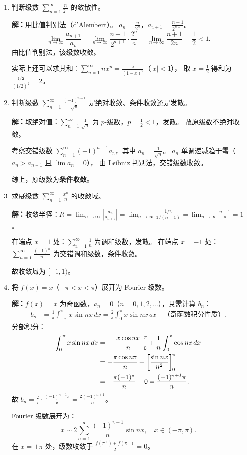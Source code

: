 \documentclass[12pt,a4paper]{ctexart}
\begin{document}
\begin{enumerate}[leftmargin=*,label=\arabic*.,start=46]
  \item 判断级数 $\displaystyle\sum_{n=1}^{\infty}\frac{n}{2^n}$ 的敛散性。

    \textbf{解：}用比值判别法（d'Alembert）。
    $a_n = \frac{n}{2^n}$，$a_{n+1} = \frac{n+1}{2^{n+1}}$。
    \[
    \lim_{n\to\infty}\frac{a_{n+1}}{a_n}
    = \lim_{n\to\infty}\frac{n+1}{2^{n+1}} \cdot \frac{2^n}{n}
    = \lim_{n\to\infty}\frac{n+1}{2n}
    = \frac{1}{2} < 1.
    \]
    由比值判别法，该级数收敛。

    实际上还可以求其和：$\sum_{n=1}^{\infty} n x^n = \frac{x}{(1-x)^2}$（$|x|<1$），
    取 $x=\frac{1}{2}$ 得和为 $\frac{1/2}{(1/2)^2} = 2$。

  \item 判断级数 $\displaystyle\sum_{n=1}^{\infty}\frac{(-1)^{n-1}}{\sqrt{n}}$ 是绝对收敛、条件收敛还是发散。

    \textbf{解：}取绝对值：$\sum_{n=1}^{\infty} \frac{1}{\sqrt{n}}$ 为 $p$-级数，$p=\frac{1}{2} < 1$，发散。
    故原级数不绝对收敛。

    考察交错级数 $\sum_{n=1}^{\infty} (-1)^{n-1} a_n$，其中 $a_n = \frac{1}{\sqrt{n}}$。
    $a_n$ 单调递减趋于零（$a_n > a_{n+1}$ 且 $\lim a_n = 0$），
    由 Leibniz 判别法，交错级数收敛。

    综上，原级数为\textbf{条件收敛}。

  \item 求幂级数 $\displaystyle\sum_{n=1}^{\infty}\frac{x^n}{n}$ 的收敛域。

    \textbf{解：}收敛半径：$R = \lim_{n\to\infty}\left|\frac{a_n}{a_{n+1}}\right|
    = \lim_{n\to\infty}\frac{1/n}{1/(n+1)} = \lim_{n\to\infty}\frac{n+1}{n} = 1$。

    在端点 $x=1$ 处：$\sum_{n=1}^{\infty} \frac{1}{n}$ 为调和级数，发散。
    在端点 $x=-1$ 处：$\sum_{n=1}^{\infty} \frac{(-1)^n}{n}$ 为交错调和级数，条件收敛。

    故收敛域为 $[-1, 1)$。

  \item 将 $f(x) = x$（$-\pi < x < \pi$）展开为 Fourier 级数。

    \textbf{解：}$f(x)=x$ 为奇函数，$a_n = 0$（$n=0,1,2,\dots$），只需计算 $b_n$：
    \begin{align*}
      b_n &= \frac{1}{\pi}\int_{-\pi}^{\pi} x \sin nx \, dx
           = \frac{2}{\pi}\int_0^{\pi} x \sin nx \, dx \quad\text{（奇函数积分性质）}.
    \end{align*}
    分部积分：
    \begin{align*}
      \int_0^{\pi} x \sin nx \, dx
      &= \Bigl[-\frac{x\cos nx}{n}\Bigr]_0^{\pi} + \frac{1}{n}\int_0^{\pi} \cos nx \, dx \\
      &= -\frac{\pi\cos n\pi}{n} + \left[\frac{\sin nx}{n^2}\right]_0^{\pi} \\
      &= -\frac{\pi(-1)^n}{n} + 0
       = \frac{(-1)^{n+1}\pi}{n}.
    \end{align*}
    故 $b_n = \frac{2}{\pi} \cdot \frac{(-1)^{n+1}\pi}{n} = \frac{2(-1)^{n+1}}{n}$。

    Fourier 级数展开为：
    \[
    x \sim 2\sum_{n=1}^{\infty}\frac{(-1)^{n+1}}{n}\sin nx, \quad x \in (-\pi,\pi).
    \]
    在 $x=\pm\pi$ 处，级数收敛于 $\frac{f(\pi^+)+f(\pi^-)}{2} = 0$。
\end{enumerate}
\end{document}
